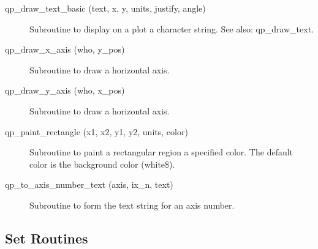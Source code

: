 \begin{description}
\item[qp_draw_text_basic (text, x, y, units, justify, angle)] \Newline 
     Subroutine to display on a plot a character string.
     See also: qp_draw_text.

\item[qp_draw_x_axis (who, y_pos)] \Newline 
     Subroutine to draw a horizontal axis.

\item[qp_draw_y_axis (who, x_pos)] \Newline 
     Subroutine to draw a horizontal axis.

\item[qp_paint_rectangle (x1, x2, y1, y2, units, color)] \Newline 
Subroutine to paint a rectangular region a specified color.
The default color is the background color (white\$).

\item[qp_to_axis_number_text (axis, ix_n, text)] \Newline 
     Subroutine to form the text string for an axis number.

\end{description}

\subsection{Set Routines}

